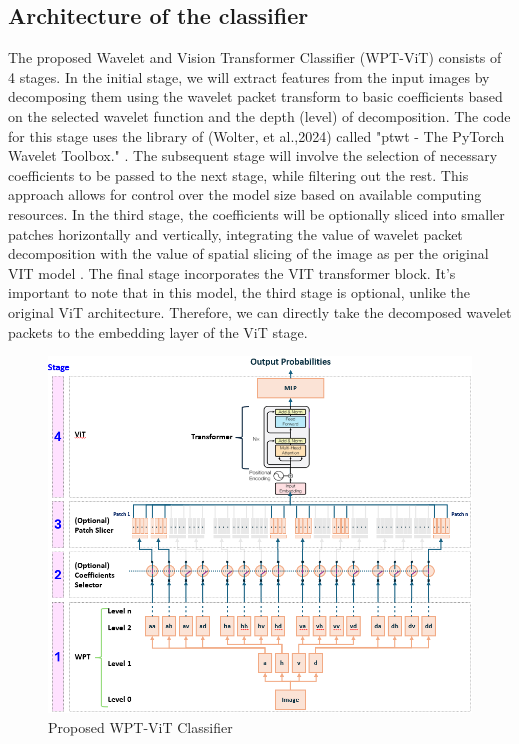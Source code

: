 \documentclass{svproc}
\begin{document}
\subsection{Architecture of the classifier}
The proposed Wavelet and Vision Transformer Classifier (WPT-ViT) consists of 4 stages. In the initial stage, we will extract features from the input images by decomposing them using the wavelet packet transform to basic coefficients based on the selected wavelet function and the depth (level) of decomposition. The code for this stage uses the library of (Wolter, et al.,2024) called "ptwt - The PyTorch Wavelet Toolbox."  \cite{wolter2024ptwt}. The subsequent stage will involve the selection of necessary coefficients to be passed to the next stage, while filtering out the rest. This approach allows for control over the model size based on available computing resources.
In the third stage, the coefficients will be optionally sliced into smaller patches horizontally and vertically, integrating the value of wavelet packet decomposition with the value of spatial slicing of the image as per the original VIT model \cite {dosovitskiy2020image}. 
The final stage incorporates the VIT transformer block. It's important to note that in this model, the third stage is optional, unlike the original ViT architecture. Therefore, we can directly take the decomposed wavelet packets to the embedding layer of the ViT stage.   

\begin{figure}[H]
  \centering
    \includegraphics[width=1.0\linewidth]{figures/WPT-ViT_model.png}
    \caption{Proposed WPT-ViT Classifier}
    \label{fig:wptvit}
\end{figure}
\end{document}
